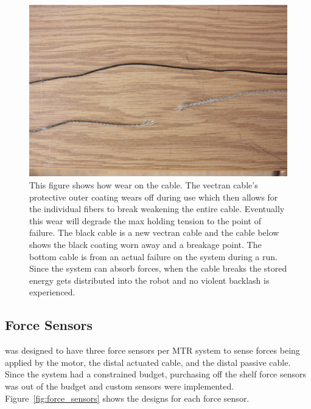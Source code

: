 \begin{appendices}
\begin{figure}[thpb]
      \centering
      \includegraphics[width=0.8\columnwidth]{tex/img/broken_cable}
      \caption{This figure shows how wear on the cable. The vectran cable's protective outer coating wears off during use which then allows for the individual fibers to break weakening the entire cable. Eventually this wear will degrade the max holding tension to the point of failure. The black cable is a new vectran cable and the cable below shows the black coating worn away and a breakage point. The bottom cable is from an actual failure on the system during a run. Since the system can absorb forces, when the cable breaks the stored energy gets distributed into the robot and no violent backlash is experienced.}
      \label{fig:cable_break}
\end{figure}

\subsection{Force Sensors}
\label{force_sensing_failure}
\SB{} was designed to have three force sensors per MTR system to sense forces being applied by the motor, the distal actuated cable, and the distal passive cable.
Since the system had a constrained budget, purchasing off the shelf force sensors was out of the budget and custom sensors were implemented.
Figure~\ref{fig:force_sensors} shows the designs for each force sensor.


\end{appendices}
